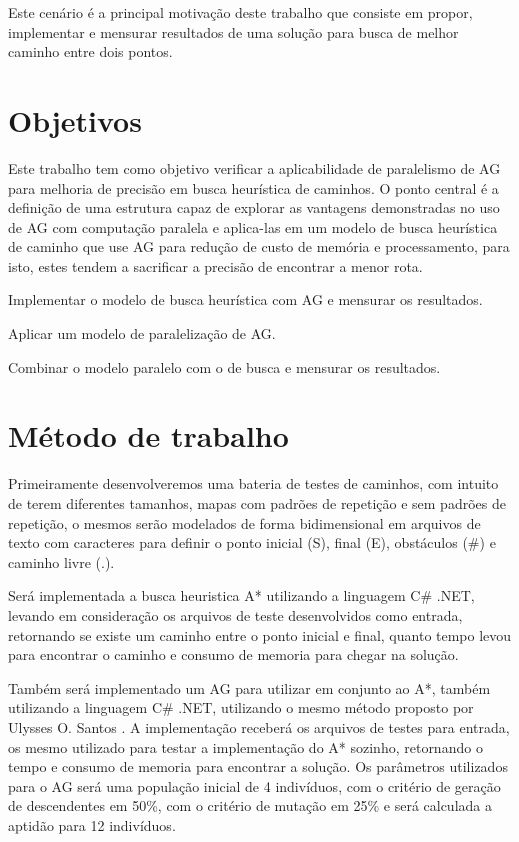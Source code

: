 Este cenário é a principal motivação deste trabalho que consiste em propor, implementar e mensurar resultados de uma solução para busca de melhor caminho entre dois pontos.

\section{Objetivos}

Este trabalho tem como objetivo verificar a aplicabilidade de paralelismo de AG para melhoria de precisão em busca heurística de caminhos. O ponto central é a definição de uma estrutura capaz de explorar as vantagens demonstradas no uso de AG com computação paralela e aplica-las em um modelo de busca heurística de caminho que use AG para redução de custo de memória e processamento, para isto, estes tendem a sacrificar a precisão de encontrar a menor rota. 

Implementar o modelo de busca heurística com AG e mensurar os resultados. 

Aplicar um modelo de paralelização de AG. 

Combinar o modelo paralelo com o de busca e mensurar os resultados.


\section{Método de trabalho}

Primeiramente desenvolveremos uma bateria de testes de caminhos, com intuito de terem diferentes tamanhos, mapas com padrões de repetição e sem padrões de repetição, o mesmos serão modelados de forma bidimensional em arquivos de texto com caracteres para definir o ponto inicial (S), final (E), obstáculos (\#) e caminho livre (.).

Será implementada a busca heuristica A* utilizando a linguagem C\# .NET, levando em consideração os arquivos de teste desenvolvidos como entrada, retornando se existe um caminho entre o ponto inicial e final, quanto tempo levou para encontrar o caminho e consumo de memoria para chegar na solução. 

Também será implementado um AG para utilizar em conjunto ao A*, também utilizando a linguagem C\# .NET, utilizando o mesmo método proposto por Ulysses O. Santos \cite{Ulysses}. A implementação receberá os arquivos de testes para entrada, os mesmo utilizado para testar a implementação do A* sozinho, retornando o tempo e consumo de memoria para encontrar a solução.
Os parâmetros utilizados para o AG será uma população inicial de 4 indivíduos, com o critério de geração de descendentes em 50\%, com o critério de mutação em 25\% e será calculada a aptidão para 12 indivíduos.

